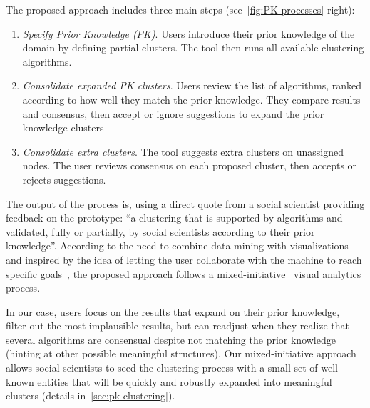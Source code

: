 The proposed approach includes three main steps (see~\autoref{fig:PK-processes} right):
\begin{enumerate}[nosep]
\item \textit{Specify Prior Knowledge (PK)}. Users introduce their prior knowledge of the domain by defining partial clusters. The tool then runs all available clustering algorithms.
\item \textit{Consolidate expanded PK clusters}. Users review the list of algorithms, ranked according to how well they match the prior knowledge.  They compare results and consensus, then accept or ignore suggestions to expand the prior knowledge clusters
\item \textit{Consolidate extra clusters}. The tool suggests extra clusters on unassigned nodes. The user reviews consensus on each proposed cluster, then accepts or rejects suggestions.
\end{enumerate}

The output of the process is, using a direct quote from a social scientist providing feedback on the prototype: ``a clustering that is supported by algorithms and validated, fully or partially, by social scientists according to their prior knowledge''.
According to the need to combine data mining with visualizations~\cite{Ben02DiscoveryTools} and inspired by the idea of letting the user collaborate with the machine to reach specific goals~\cite{Horvitz99}, the proposed approach follows a  mixed-initiative~\cite{Horvitz99} visual analytics process.

In our case, users focus on the results that expand on their prior knowledge, filter-out the most implausible results, but can readjust  when they realize that several algorithms are consensual despite not matching the prior knowledge (hinting at other possible meaningful structures). Our mixed-initiative approach allows social scientists to seed the clustering process with a small set of well-known entities that will be quickly and robustly expanded into meaningful clusters (details in~\autoref{sec:pk-clustering}).

